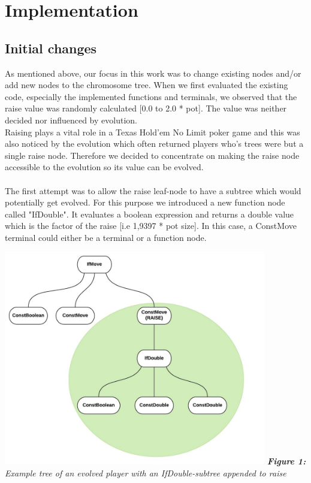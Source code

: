 \documentclass[12pt,fleqn,a4paper]{article}
\begin{document}
\newpage
\section{Implementation}
\subsection{Initial changes}
As mentioned above, our focus in this work was to change existing nodes and/or add
new nodes to the chromosome tree. When we first evaluated the existing code, especially the implemented functions and terminals, we observed that the raise value was randomly calculated [0.0 to 2.0 * pot]. The value was neither decided nor influenced by evolution. \\
Raising plays a vital role in a Texas Hold'em No Limit poker game and this was also noticed by the evolution which often returned players who's trees were but a single raise node.
Therefore we decided to concentrate on making the raise node accessible to the evolution so its value can be evolved.
\\ \\ 
The first attempt was to allow the raise leaf-node to have a subtree which would potentially get evolved. For this purpose we introduced a new function node called "IfDouble". It evaluates a boolean expression and returns a double value which is the factor of the raise [i.e 1,9397 * pot size]. In this case, a ConstMove terminal could either be a terminal or a function node.

\begin{center}
	\includegraphics[width=0.86\textwidth]{raise_subtree_1.png}
	\textit{\textbf{Figure 1: }Example tree of an evolved player with an IfDouble-subtree appended to raise}
\end{center}
\end{document}
